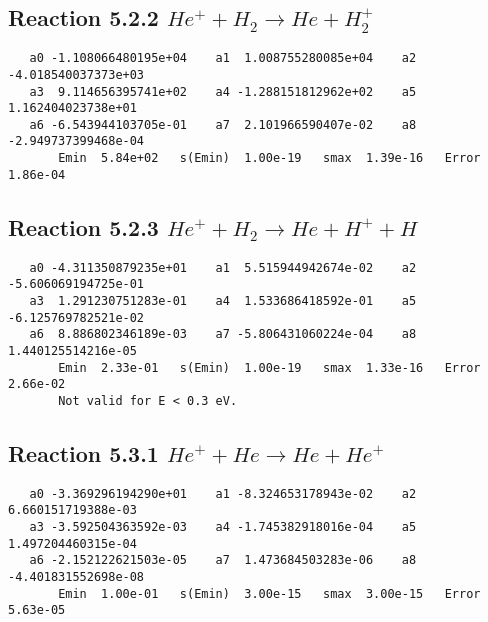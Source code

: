 \documentclass[12pt]{article}
\begin{document}
\newpage
\subsection{
Reaction 5.2.2 $   He^+ + H_2 \rightarrow He + H_2^+$}


\begin{small}\begin{verbatim}
   a0 -1.108066480195e+04    a1  1.008755280085e+04    a2 -4.018540037373e+03
   a3  9.114656395741e+02    a4 -1.288151812962e+02    a5  1.162404023738e+01
   a6 -6.543944103705e-01    a7  2.101966590407e-02    a8 -2.949737399468e-04
       Emin  5.84e+02   s(Emin)  1.00e-19   smax  1.39e-16   Error  1.86e-04
\end{verbatim}\end{small}

\newpage
\subsection{
Reaction 5.2.3 $   He^+ + H_2 \rightarrow He + H^+ + H$}


\begin{small}\begin{verbatim}
   a0 -4.311350879235e+01    a1  5.515944942674e-02    a2 -5.606069194725e-01
   a3  1.291230751283e-01    a4  1.533686418592e-01    a5 -6.125769782521e-02
   a6  8.886802346189e-03    a7 -5.806431060224e-04    a8  1.440125514216e-05
       Emin  2.33e-01   s(Emin)  1.00e-19   smax  1.33e-16   Error  2.66e-02
       Not valid for E < 0.3 eV.
\end{verbatim}\end{small}

\newpage
\subsection{
Reaction 5.3.1 $   He^+ + He \rightarrow He + He^+$}


\begin{small}\begin{verbatim}
   a0 -3.369296194290e+01    a1 -8.324653178943e-02    a2  6.660151719388e-03
   a3 -3.592504363592e-03    a4 -1.745382918016e-04    a5  1.497204460315e-04
   a6 -2.152122621503e-05    a7  1.473684503283e-06    a8 -4.401831552698e-08
       Emin  1.00e-01   s(Emin)  3.00e-15   smax  3.00e-15   Error  5.63e-05
\end{verbatim}\end{small}
\end{document}

